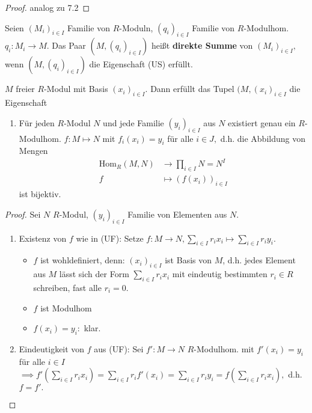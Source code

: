 \documentclass[a4paper, titlepage]{article}
\theoremstyle{definition}
\newcommand{\Hom}{\mathrm{Hom}}
\begin{document}
        \begin{proof}
            analog zu 7.2
        \end{proof}
        \begin{definition}
            Seien $(M_i)_{i\in I}$ Familie von $R$-Moduln, $(q_i)_{i\in I}$ Familie von $R$-Modulhom. $q_i:M_i\longrightarrow M.$\newline
            Das Paar $(M,(q_i)_{i\in I})$ heißt \textbf{direkte Summe} von $(M_i)_{i\in I},$ wenn $(M,(q_i)_{i\in I})$ die Eigenschaft (US) erfüllt.
        \end{definition}
        \begin{satz}
            $M$ freier $R$-Modul mit Basis $(x_i)_{i\in I}.$ 
            Dann erfüllt das Tupel $(M,(x_i)_{i\in I}$ die Eigenschaft
            \begin{enumerate}[(UF)]
                   \item Für jeden $R$-Modul $N$ und jede Familie $(y_i)_{i\in I}$ aus $N$ existiert genau ein $R$-Modulhom. $f:M\mapsto N $ mit $f_i(x_i)=y_i $ für alle $i\in J,$
                   d.h. die Abbildung von Mengen 
                   \begin{align*}
                       \Hom_R(M,N)&\longrightarrow \prod_{i\in I}N=N^{I}\\
                       f&\longmapsto (f(x_i))_{i\in I}
                   \end{align*}
                   ist bijektiv.
               \end{enumerate}
        \end{satz}
        \begin{proof}
            Sei $N$ $R$-Modul, $(y_i)_{i\in I}$ Familie von Elementen aus $N$. 
            \begin{enumerate}[1.]
                \item Existenz von $f$ wie in (UF):\newline
                Setze $f:M\longrightarrow N, \sum\limits_{i\in I}r_ix_i\longmapsto\sum\limits_{i\in I}r_iy_i.$
                \begin{itemize}
                    \item $f$ ist wohldefiniert, denn: $(x_i)_{i\in I}$ ist Basis von $M$, d.h. jedes Element aus $M$ lässt sich der Form $\sum\limits_{i\in I}r_ix_i$ mit eindeutig bestimmten $r_i\in R$ schreiben, fast alle $r_i=0.$
                    \item $f$ ist Modulhom
                    \item $f(x_i)=y_i:$ klar.
                \end{itemize}
                \item Eindeutigkeit von $f$ aus (UF):\newline
                Sei $f': M\longrightarrow N$ $R$-Modulhom. mit $f'(x_i)=y_i$ für alle $i\in I$ $\implies f'(\sum\limits_{i\in I}r_ix_i)=\sum\limits_{i\in I}r_if'(x_i)=\sum\limits_{i\in I}r_iy_i=f(\sum\limits_{i\in I}r_ix_i),$ d.h. $f=f'.$
            \end{enumerate}
        \end{proof}
\end{document}
